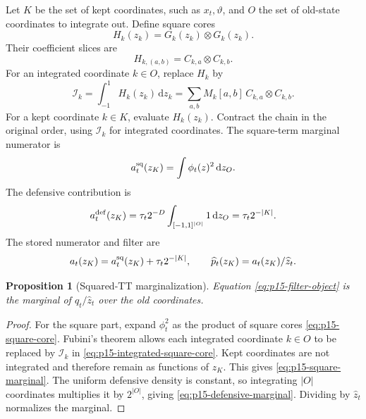 \documentclass[11pt]{article}
\newcommand{\dd}{\mathrm{d}}
\newtheorem{proposition}{Proposition}
\theoremstyle{definition}
\theoremstyle{remark}
\renewcommand{\[}{\begin{equation}}
\renewcommand{\]}{\end{equation}}
\begin{document}
Let \(K\) be the set of kept coordinates, such as \(x_t,\vartheta\), and
\(O\) the set of old-state coordinates to integrate out.  Define square cores
\[
  H_k(z_k)=G_k(z_k)\otimes G_k(z_k).
  \label{eq:p15-square-core}
\]
Their coefficient slices are
\[
  H_{k,(a,b)}=C_{k,a}\otimes C_{k,b}.
  \label{eq:p15-square-core-coeff}
\]
For an integrated coordinate \(k\in O\), replace \(H_k\) by
\[
  \mathcal I_k
  =
  \int_{-1}^{1}H_k(z_k)\,\dd z_k
  =
  \sum_{a,b}M_k[a,b]\,C_{k,a}\otimes C_{k,b}.
  \label{eq:p15-integrated-square-core}
\]
For a kept coordinate \(k\in K\), evaluate \(H_k(z_k)\).  Contract the chain
in the original order, using \(\mathcal I_k\) for integrated coordinates.  The
square-term marginal numerator is
\[
  a_t^{\rm sq}(z_K)
  =
  \int \phi_t(z)^2\,\dd z_O.
  \label{eq:p15-square-marginal}
\]
The defensive contribution is
\[
  a_t^{\rm def}(z_K)
  =
  \tau_t 2^{-D}\int_{[-1,1]^{|O|}}1\,\dd z_O
  =
  \tau_t2^{-|K|}.
  \label{eq:p15-defensive-marginal}
\]
The stored numerator and filter are
\[
  a_t(z_K)=a_t^{\rm sq}(z_K)+\tau_t2^{-|K|},
  \qquad
  \widehat p_t(z_K)=a_t(z_K)/\widehat z_t.
  \label{eq:p15-filter-object}
\]

\begin{proposition}[Squared-TT marginalization]
Equation \eqref{eq:p15-filter-object} is the marginal of
\(\widehat q_t/\widehat z_t\) over the old coordinates.
\end{proposition}

\begin{proof}
For the square part, expand \(\phi_t^2\) as the product of square cores
\eqref{eq:p15-square-core}.  Fubini's theorem allows each integrated
coordinate \(k\in O\) to be replaced by \(\mathcal I_k\) in
\eqref{eq:p15-integrated-square-core}.  Kept coordinates are not integrated
and therefore remain as functions of \(z_K\).  This gives
\eqref{eq:p15-square-marginal}.  The uniform defensive density is constant, so
integrating \(|O|\) coordinates multiplies it by \(2^{|O|}\), giving
\eqref{eq:p15-defensive-marginal}.  Dividing by \(\widehat z_t\) normalizes the
marginal.
\end{proof}
\end{document}
